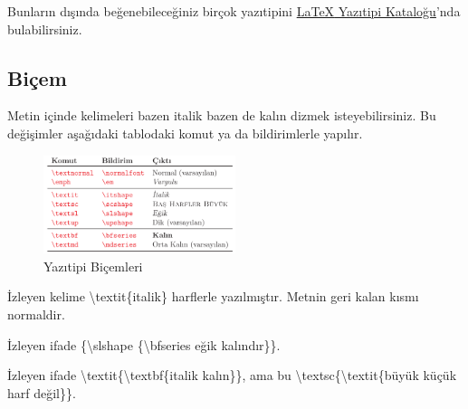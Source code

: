 \documentclass[
  letterpaper,
  DIV=11,
  numbers=noendperiod]{scrreprt}
\newenvironment{Shaded}{\begin{snugshade}}{\end{snugshade}}
\newcommand{\FunctionTok}[1]{\textcolor[rgb]{0.28,0.35,0.67}{#1}}
\newcommand{\NormalTok}[1]{\textcolor[rgb]{0.00,0.23,0.31}{#1}}
\begin{document}
Bunların dışında beğenebileceğiniz birçok yazıtipini
\href{https://tug.org/FontCatalogue/}{{\LaTeX} Yazıtipi Kataloğu}'nda
bulabilirsiniz.

\hypertarget{biuxe7em}{%
\subsection{Biçem}\label{biuxe7em}}

Metin içinde kelimeleri bazen italik bazen de kalın dizmek
isteyebilirsiniz. Bu değişimler aşağıdaki tablodaki komut ya da
bildirimlerle yapılır.

\begin{figure}

{\centering \includegraphics[width=0.5\textwidth,height=\textheight]{./images/yazitipi7.png}

}

\caption{Yazıtipi Biçemleri}

\end{figure}

\begin{Shaded}
\begin{Highlighting}[]
\NormalTok{İzleyen kelime }\FunctionTok{\textbackslash{}textit}\NormalTok{\{italik\} }
\NormalTok{harflerle yazılmıştır.}
\NormalTok{Metnin geri kalan kısmı}
\NormalTok{normaldir.}
\end{Highlighting}
\end{Shaded}

\begin{Shaded}
\begin{Highlighting}[]
\NormalTok{İzleyen ifade \{}\FunctionTok{\textbackslash{}slshape}\NormalTok{ \{}\FunctionTok{\textbackslash{}bfseries}\NormalTok{ eğik kalındır\}\}.}
\end{Highlighting}
\end{Shaded}

\begin{Shaded}
\begin{Highlighting}[]
\NormalTok{İzleyen ifade }\FunctionTok{\textbackslash{}textit}\NormalTok{\{}\FunctionTok{\textbackslash{}textbf}\NormalTok{\{italik kalın\}\}, ama bu}
\FunctionTok{\textbackslash{}textsc}\NormalTok{\{}\FunctionTok{\textbackslash{}textit}\NormalTok{\{büyük küçük harf değil\}\}.}
\end{Highlighting}
\end{Shaded}
\end{document}

